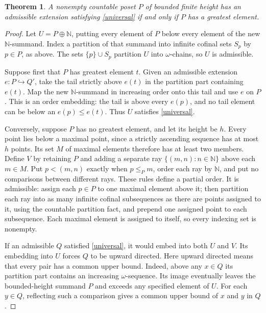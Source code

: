 \documentclass[11pt]{article}
\newtheorem{theorem}{Theorem}
\newcommand{\N}{\mathbb N}
\begin{document}
\begin{theorem}\label{finite}
A nonempty countable poset $P$ of bounded finite height has an admissible extension satisfying
\eqref{universal} if and only if $P$ has a greatest element.
\end{theorem}
\begin{proof}
Let $U=P\oplus\N$, putting every element of $P$ below every element of the
new $\N$-summand. Index a partition of that summand into infinite cofinal
sets $S_p$ by $p\in P$, as above. The sets $\{p\}\cup S_p$ partition $U$
into $\omega$-chains, so $U$ is admissible.

Suppose first that $P$ has greatest element $t$.
Given an admissible extension $e:P\hookrightarrow Q'$, take
the tail strictly above $e(t)$ in the partition part containing $e(t)$.
Map the new $\N$-summand in increasing order onto this tail and use $e$ on
$P$. This is an order embedding: the tail is above every $e(p)$, and no tail
element can be below an $e(p)\leq e(t)$. Thus $U$ satisfies \eqref{universal}.

Conversely, suppose $P$ has no greatest element, and let its height be $h$.
Every point lies below a maximal point, since a strictly ascending sequence
has at most $h$ points. Its set $M$ of maximal elements therefore has at
least two members. Define $V$ by retaining $P$ and adding
a separate ray $\{(m,n):n\in\N\}$ above each $m\in M$. Put
$p<(m,n)$ exactly when $p\leq_P m$, order each ray by $\N$, and put no
comparisons between different rays. These rules define a partial order.
It is admissible: assign each $p\in P$ to one maximal element above it;
then partition each ray into as many infinite cofinal subsequences as there
are points assigned to it, using the countable partition fact, and prepend
one assigned point to each subsequence.
Each maximal element is assigned to itself, so every indexing set is nonempty.

If an admissible $Q$ satisfied \eqref{universal}, it would embed into both
$U$ and $V$. Its embedding into $U$ forces $Q$ to be upward directed.
Here upward directed means that every pair has a common upper bound.
Indeed, above any $x\in Q$ its partition part contains an increasing
$\omega$-sequence. Its image eventually leaves the bounded-height summand $P$ and
exceeds any specified element of $U$. For each $y\in Q$, reflecting such a
comparison gives a common upper bound of $x$ and $y$ in $Q$.


\end{proof}
\end{document}
